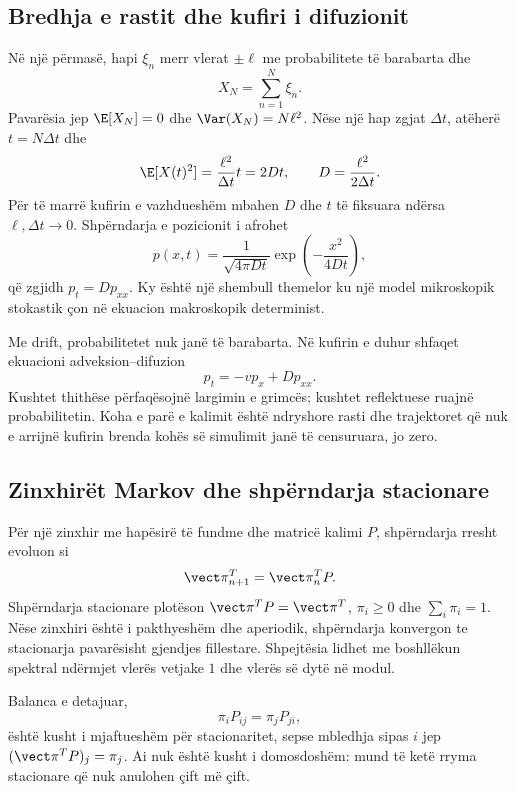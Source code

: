 \subsection{Bredhja e rastit dhe kufiri i difuzionit}
Në një përmasë, hapi $\xi_n$ merr vlerat $\pm\ell$ me probabilitete të barabarta dhe
\begin{equation}
 X_N=\sum_{n=1}^{N}\xi_n.
\end{equation}
Pavarësia jep $\E[X_N]=0$ dhe $\Var(X_N)=N\ell^2$. Nëse një hap zgjat $\Delta t$, atëherë $t=N\Delta t$ dhe
\begin{equation}
 \E[X(t)^2]=\frac{\ell^2}{\Delta t}t=2Dt,
 \qquad D=\frac{\ell^2}{2\Delta t}.
\end{equation}
Për të marrë kufirin e vazhdueshëm mbahen $D$ dhe $t$ të fiksuara ndërsa $\ell,\Delta t\to0$. Shpërndarja e pozicionit i afrohet
\begin{equation}
 p(x,t)=\frac{1}{\sqrt{4\pi Dt}}\exp\left(-\frac{x^2}{4Dt}\right),
\end{equation}
që zgjidh $p_t=Dp_{xx}$. Ky është një shembull themelor ku një model mikroskopik stokastik çon në ekuacion makroskopik determinist.

Me drift, probabilitetet nuk janë të barabarta. Në kufirin e duhur shfaqet ekuacioni adveksion--difuzion
\begin{equation}
 p_t=-v p_x+Dp_{xx}.
\end{equation}
Kushtet thithëse përfaqësojnë largimin e grimcës; kushtet reflektuese ruajnë probabilitetin. Koha e parë e kalimit është ndryshore rasti dhe trajektoret që nuk e arrijnë kufirin brenda kohës së simulimit janë të censuruara, jo zero.

\subsection{Zinxhirët Markov dhe shpërndarja stacionare}
Për një zinxhir me hapësirë të fundme dhe matricë kalimi $P$, shpërndarja rresht evoluon si
\begin{equation}
 \vect\pi_{n+1}^T=\vect\pi_n^TP.
\end{equation}
Shpërndarja stacionare plotëson $\vect\pi^TP=\vect\pi^T$, $\pi_i\ge0$ dhe $\sum_i\pi_i=1$. Nëse zinxhiri është i pakthyeshëm dhe aperiodik, shpërndarja konvergon te stacionarja pavarësisht gjendjes fillestare. Shpejtësia lidhet me boshllëkun spektral ndërmjet vlerës vetjake $1$ dhe vlerës së dytë në modul.

Balanca e detajuar,
\begin{equation}
 \pi_iP_{ij}=\pi_jP_{ji},
\end{equation}
është kusht i mjaftueshëm për stacionaritet, sepse mbledhja sipas $i$ jep $(\vect\pi^TP)_j=\pi_j$. Ai nuk është kusht i domosdoshëm: mund të ketë rryma stacionare që nuk anulohen çift më çift.

